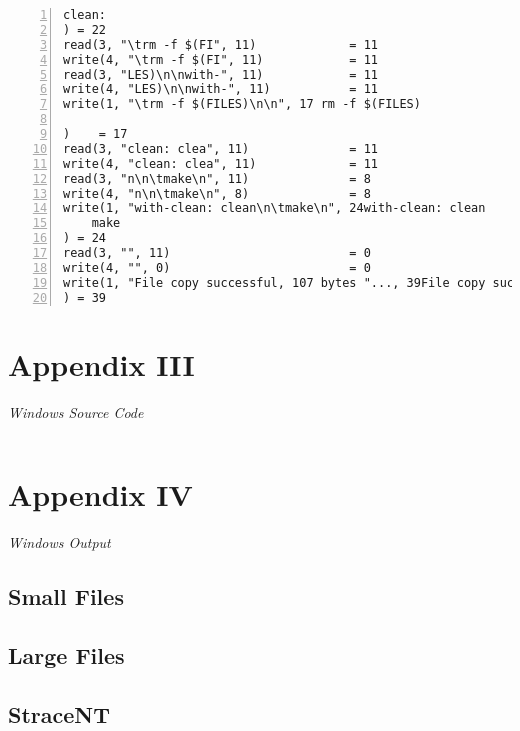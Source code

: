 \documentclass[12pt]{article}
\newcommand {\includesource}[2] {\inputminted[linenos, fontsize=\scriptsize, frame=lines]{#1}{#2}}
\newcommand {\append}[2] {\section*{Appendix #1} \textsl{\large #2}}
\begin{document}
\begin{lstlisting}[numbers=left, breaklines=true, basicstyle=\scriptsize]
clean:
) = 22
read(3, "\trm -f $(FI", 11)             = 11
write(4, "\trm -f $(FI", 11)            = 11
read(3, "LES)\n\nwith-", 11)            = 11
write(4, "LES)\n\nwith-", 11)           = 11
write(1, "\trm -f $(FILES)\n\n", 17	rm -f $(FILES)

)    = 17
read(3, "clean: clea", 11)              = 11
write(4, "clean: clea", 11)             = 11
read(3, "n\n\tmake\n", 11)              = 8
write(4, "n\n\tmake\n", 8)              = 8
write(1, "with-clean: clean\n\tmake\n", 24with-clean: clean
	make
) = 24
read(3, "", 11)                         = 0
write(4, "", 0)                         = 0
write(1, "File copy successful, 107 bytes "..., 39File copy successful, 107 bytes copied
) = 39
\end{lstlisting}


\append{III} {Windows Source Code}
\includesource{c}{win_copy.c}


\append{IV} {Windows Output}
\subsection*{Small Files}
\subsection*{Large Files}
\subsection*{StraceNT}
\end{document}
